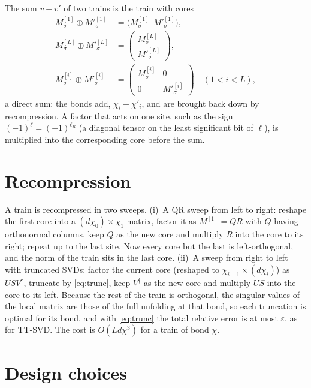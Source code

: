 \documentclass[aps,prb,reprint,a4paper]{revtex4-2}
\begin{document}
The sum $v+v'$ of two trains is the train with cores
\begin{equation}
  \begin{aligned}
  M^{[1]}_{\sigma}\oplus M'^{[1]}_{\sigma}&=\big(M^{[1]}_\sigma\ \ M'^{[1]}_\sigma\big),\\
  M^{[L]}_\sigma\oplus M'^{[L]}_\sigma&=\begin{pmatrix}M^{[L]}_\sigma\\M'^{[L]}_\sigma\end{pmatrix},\\
  M^{[i]}_\sigma\oplus M'^{[i]}_\sigma&=\begin{pmatrix}M^{[i]}_\sigma&0\\0&M'^{[i]}_\sigma\end{pmatrix}\quad(1<i<L),
  \end{aligned}
  \label{eq:sum}
\end{equation}
a direct sum: the bonds add, $\chi_i+\chi'_i$, and are brought back down by recompression. A factor that acts on one site, such as the sign $(-1)^\ell=(-1)^{\ell_R}$ (a diagonal tensor on the least significant bit of $\ell$), is multiplied into the corresponding core before the sum.

\section{Recompression}
\label{app:recomp}

A train is recompressed in two sweeps. (i)~A QR sweep from left to right: reshape the first core into a $(d\chi_0)\times\chi_1$ matrix, factor it as $M^{[1]}=QR$ with $Q$ having orthonormal columns, keep $Q$ as the new core and multiply $R$ into the core to its right; repeat up to the last site. Now every core but the last is left-orthogonal, and the norm of the train sits in the last core. (ii)~A sweep from right to left with truncated SVDs: factor the current core (reshaped to $\chi_{i-1}\times(d\chi_i)$) as $USV^\dagger$, truncate by \eqref{eq:trunc}, keep $V^\dagger$ as the new core and multiply $US$ into the core to its left. Because the rest of the train is orthogonal, the singular values of the local matrix are those of the full unfolding at that bond, so each truncation is optimal for its bond, and with \eqref{eq:trunc} the total relative error is at most $\varepsilon$, as for TT-SVD. The cost is $O(Ld\chi^3)$ for a train of bond $\chi$.

\section{Design choices}
\label{sec:choices}
\end{document}
